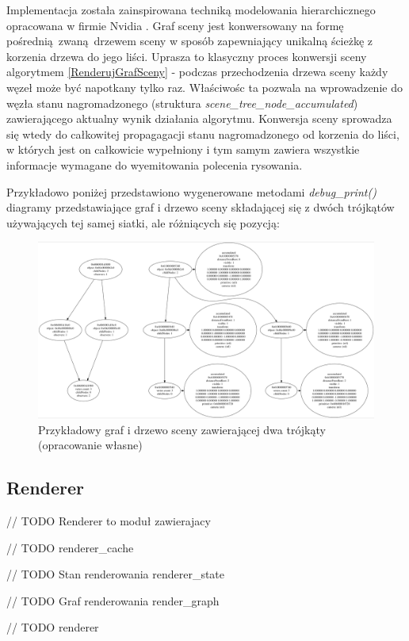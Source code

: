 Implementacja została zainspirowana techniką modelowania hierarchicznego opracowana w firmie Nvidia \cite{ADVANCEDSCENEGRAPH}.
Graf sceny jest konwersowany na formę pośrednią zwaną drzewem sceny w sposób zapewniający unikalną ścieżkę z korzenia drzewa do jego liści.
Uprasza to klasyczny proces konwersji sceny algorytmem \ref{RenderujGrafSceny} - podczas przechodzenia drzewa sceny każdy węzeł może być napotkany tylko raz.
Właściwośc ta pozwala na wprowadzenie do węzła stanu nagromadzonego (struktura \textit{scene\_tree\_node\_accumulated}) zawierającego aktualny wynik działania algorytmu.
Konwersja sceny sprowadza się wtedy do całkowitej propagagacji stanu nagromadzonego od korzenia do liści, w których jest on całkowicie wypełniony i tym samym zawiera wszystkie informacje wymagane do wyemitowania polecenia rysowania.

Przykładowo poniżej przedstawiono wygenerowane metodami \textit{debug\_print()} diagramy przedstawiające graf i drzewo sceny składającej się z dwóch trójkątów używających tej samej siatki, ale różniących się pozycją:
\begin{figure}[htbp]
	\centering
	\includegraphics[width=1.0\textwidth]{images/scene_graph_tree.png}
	\caption{Przykładowy graf i drzewo sceny zawierającej dwa trójkąty (opracowanie własne)}
	\label{triangles_scene_graph}
\end{figure}



\subsection{Renderer}

// TODO Renderer to moduł zawierajacy 

// TODO renderer\_cache

// TODO Stan renderowania renderer\_state

// TODO Graf renderowania render\_graph

// TODO renderer
